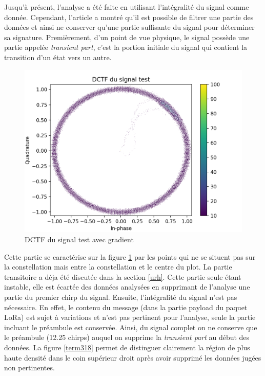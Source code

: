 \vspace{0.1cm}

Jusqu'à présent, l'analyse a été faite en utilisant l'intégralité du signal comme donnée. Cependant, l'article \cite{loraDCTF} a montré qu'il est possible de filtrer une partie des données et ainsi ne conserver qu'une partie suffisante du signal pour déterminer sa signature. Premièrement, d'un point de vue physique, le signal possède une partie appelée \textit{transient part}, c'est la portion initiale du signal qui contient la transition d'un état vers un autre.

\newpage

\begin{figure}[h]
\centering

\includegraphics[scale=0.3]{images/dctf4.png}
\caption{DCTF du signal test avec gradient}\label{term317}
\end{figure}

Cette partie se caractérise sur la figure \ref{term317} par les points qui ne se situent pas sur la constellation mais entre la constellation et le centre du plot. La partie transitoire a déja été discutée dans la section \ref{urh}. Cette partie seule étant instable, elle est écartée des données analysées en supprimant de l'analyse une partie du premier chirp du signal. Ensuite, l'intégralité du signal n'est pas nécessaire. En effet, le contenu du message (dans la partie payload du paquet \ac{LoRa}) est sujet à variations et n'est pas pertinent pour l'analyse, seule la partie incluant le préambule est conservée. Ainsi, du signal complet on ne conserve que le préambule (12.25 chirps) auquel on supprime la \textit{transient part} au début des données. La figure \ref{term318} permet de distinguer clairement la région de plus haute densité dans le coin supérieur droit après avoir supprimé les données jugées non pertinentes.

